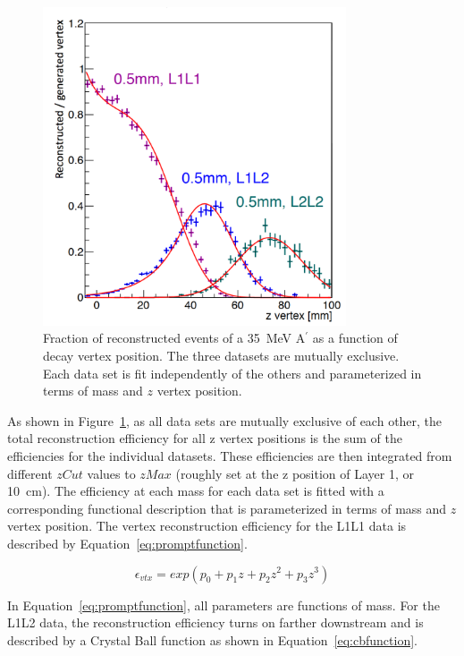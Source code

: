 \begin{figure}[H]
  \centering
      \includegraphics[width=0.8\textwidth]{pics/searching/reconstructedVtx.png}
  \caption[Fraction of reconstructed events of a 35~MeV A$^{\prime}$ as a function of decay vertex position]{Fraction of reconstructed events of a 35~MeV A$^{\prime}$ as a function of decay vertex position. The three datasets are mutually exclusive. Each data set is fit independently of the others and parameterized in terms of mass and $z$ vertex position. }
  \label{fig:apEff}
\end{figure} 

As shown in Figure~\ref{fig:apEff}, as all data sets are mutually exclusive of each other, the total reconstruction efficiency for all z vertex positions is the sum of the efficiencies for the individual datasets. These efficiencies are then integrated from different $zCut$ values to $zMax$ (roughly set at the z position of Layer 1, or 10~cm). The efficiency at each mass for each data set is fitted with a corresponding functional description that is parameterized in terms of mass and $z$ vertex position. The vertex reconstruction efficiency for the L1L1 data is described by Equation~\eqref{eq:promptfunction}.

\begin{equation}
\label{eq:promptfunction}
\epsilon_{vtx} = exp(p_0+p_1z+p_2z^2+p_3z^3) 
\end{equation}

In Equation~\eqref{eq:promptfunction}, all parameters are functions of mass. For the L1L2 data, the reconstruction efficiency turns on farther downstream and is described by a Crystal Ball function as shown in Equation~\eqref{eq:cbfunction}.

